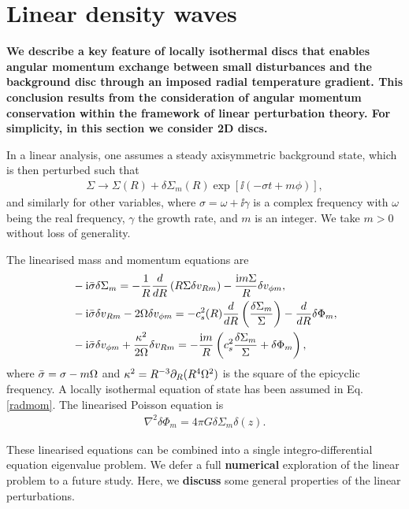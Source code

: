 \section{Linear density waves}\label{wkb}

{\bf We describe a key feature of locally isothermal discs that
  enables angular momentum exchange between small disturbances and the
  background disc through an imposed radial temperature gradient. This
  conclusion results from the consideration of angular momentum
  conservation within the framework of linear perturbation theory. 
  For simplicity, in this section we consider 2D discs. 
}

In a linear analysis, one assumes a steady axisymmetric background state, 
which is then perturbed such that
\begin{align}  
  \Sigma \to \Sigma(R) + \delta\Sigma_m(R)\exp{\left[\ii\left(-\sigma t +
        m\phi\right)\right]}, 
\end{align}
and similarly for other variables, where $\sigma=\omega+\ii\gamma$ is
a complex frequency with $\omega$ being the real frequency, 
$\gamma$ the growth rate, and $m$ is an integer. We take $m>0$ without
loss of generality.  


The linearised mass and momentum equations are
\begin{align}
  &-\mathrm{i}\bar{\sigma} \delta\Sigma_m = -\frac{1}{R}\frac{d}{dR}\left(R\Sigma\delta
    v_{Rm}\right) - \frac{\mathrm{i} m \Sigma}{R}\delta v_{\phi m}, \\
  &-\mathrm{i}\bar{\sigma}\delta v_{Rm} - 2\Omega \delta v_{\phi m} = -
  c_s^2(R)\frac{d}{dR}\left(\frac{\delta\Sigma_m}{\Sigma}\right) - \frac{d}{dR}\delta\Phi_m,\label{radmom}\\
  & -\mathrm{i}\bar{\sigma}\delta v_{\phi m} + \frac{\kappa^2}{2\Omega}\delta v_{Rm} =
  -\frac{\mathrm{i} m }{R}\left(c_s^2\frac{\delta\Sigma_m}{\Sigma} + \delta\Phi_m\right),
\end{align}
where $\bar{\sigma} = \sigma - m\Omega$ and $\kappa^2 =
R^{-3}\partial_R(R^4\Omega^2)$ is the square of the epicyclic frequency. A
locally isothermal equation of state has been assumed in
Eq. \ref{radmom}.  The linearised Poisson equation is 
\begin{align}
  \nabla^2\delta\Phi_m = 4\pi G \delta\Sigma_m \delta(z). 
\end{align}

These linearised equations can be combined into a single
integro-differential equation eigenvalue problem. We defer a full
{\bf numerical} exploration of the linear problem to a future study. Here, we {\bf
  discuss} some
general properties of the linear perturbations. 


